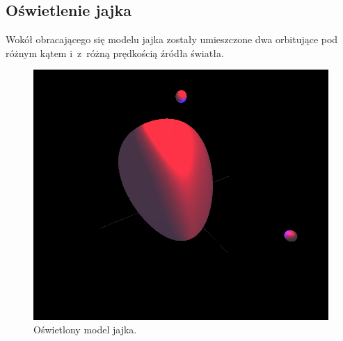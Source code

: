 \subsection{Oświetlenie jajka}
Wokół obracającego się modelu jajka zostały umieszczone dwa orbitujące pod różnym kątem i~z~różną prędkością źródła światła.
\begin{figure}[H]
    \centering
    \includegraphics[width=0.8\linewidth, trim={0cm 6cm 0cm 0.5cm},clip]{img/egg_4.png}
    \caption{Oświetlony model jajka.}
\end{figure}